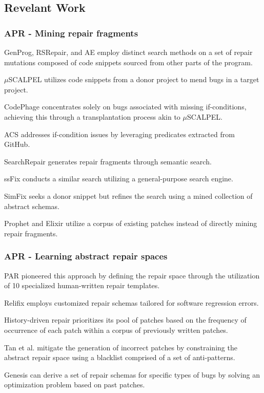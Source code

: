 \documentclass[runningheads]{llncs}
\begin{document}
\subsection{Revelant Work}
\subsubsection{APR - Mining repair fragments\\}
GenProg, RSRepair, and AE employ distinct search methods on a set of repair mutations composed of code snippets sourced from other parts of the program.

$\mu$SCALPEL utilizes code snippets from a donor project to mend bugs in a target project.

CodePhage concentrates solely on bugs associated with missing if-conditions, achieving this through a transplantation process akin to $\mu$SCALPEL.

ACS addresses if-condition issues by leveraging predicates extracted from GitHub.

SearchRepair generates repair fragments through semantic search.

ssFix conducts a similar search utilizing a general-purpose search engine.

SimFix seeks a donor snippet but refines the search using a mined collection of abstract schemas.

Prophet and Elixir utilize a corpus of existing patches instead of directly mining repair fragments.

\subsubsection{APR - Learning abstract repair spaces\\}
PAR pioneered this approach by defining the repair space through the utilization of 10 specialized human-written repair templates.

Relifix employs customized repair schemas tailored for software regression errors.

History-driven repair prioritizes its pool of patches based on the frequency of occurrence of each patch within a corpus of previously written patches.

Tan et al. \cite{24_ref_proc16} mitigate the generation of incorrect patches by constraining the abstract repair space using a blacklist comprised of a set of anti-patterns.

Genesis can derive a set of repair schemas for specific types of bugs by solving an optimization problem based on past patches.
\end{document}
